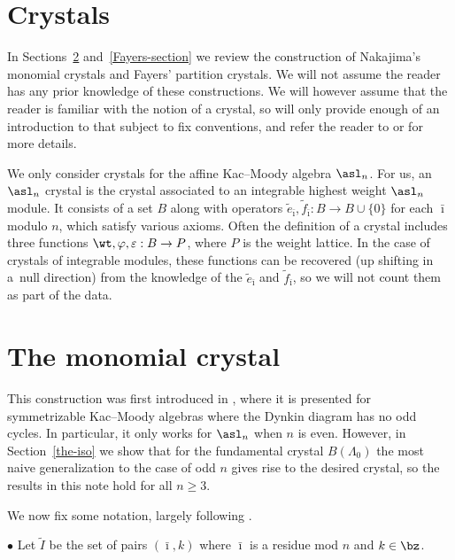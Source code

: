 \section{Crystals} \label{crystals}

In Sections~\ref{mono-section} and~\ref{Fayers-section} we review the construction of Nakajima's monomial crystals and Fayers' partition crystals. We will not assume the reader has any prior knowledge of these constructions. We will however assume that the reader is familiar with the notion of a crystal, so will only provide enough of an introduction to that subject to f\/ix conventions, and refer the reader to  \cite{Kashiwara:1995} or \cite{Hong&Kang:2000} for more details.

We only consider crystals for the af\/f\/ine Kac--Moody algebra $\asl_n$. For us, an $\asl_n$ crystal is the crystal associated to an integrable highest weight $\asl_n$ module. It consists of a set $B$ along with operators $\tilde e_{\bar \imath}, \tilde f_{\bar \imath}: B \rightarrow B \cup \{ 0 \}$ for each $\bar \imath$ modulo $n$, which satisfy various axioms. Often the def\/inition of a crystal includes three functions $\wt, \varphi, \varepsilon: B \rightarrow P$, where $P$ is the weight lattice. In the case of crystals of integrable modules, these functions can be recovered (up shifting in a~null direction) from the knowledge of the $\tilde e_{\bar \imath}$ and $\tilde f_{\bar \imath}$, so we will not count them as part of the data.

\section{The monomial crystal} \label{mono-section}

This construction was f\/irst introduced in \cite[Section 3]{Nakajima:2003}, where it is presented for symmetrizable Kac--Moody algebras where the Dynkin diagram has no odd cycles. In particular, it only works for $\asl_n$ when $n$ is even. However, in Section~\ref{the-iso} we show that for the fundamental crystal $B(\Lambda_0)$ the most naive generalization to the case of odd $n$ gives rise to the desired crystal, so the results in this note hold for all  $n \geq 3$.

We now f\/ix some notation, largely following \cite[Section~3]{Nakajima:2003}.


$\bullet$ Let $\widetilde I$ be the set of pairs $(\bar \imath, k)$ where $\bar \imath$ is a residue mod $n$ and $k \in \bz$.

